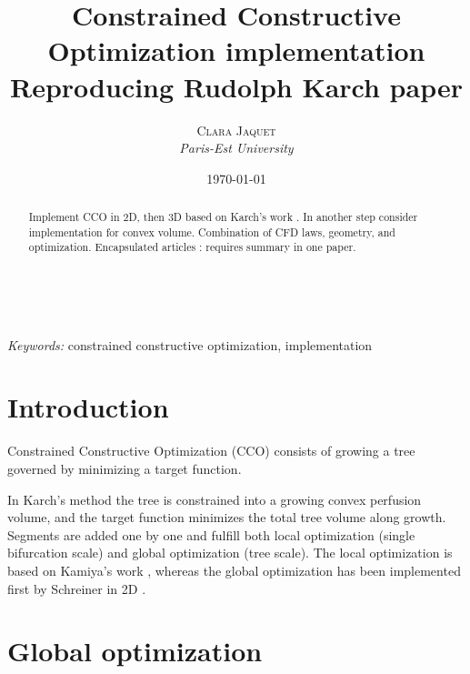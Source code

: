 \documentclass[a4paper, 11pt]{article} %
\title{\textbf{Constrained Constructive Optimization implementation}\\ %
Reproducing Rudolph Karch paper} %
\author{\textsc{Clara Jaquet} %
\\{\textit{Paris-Est University}}} %
\date{\today} %
\makeatletter
\renewcommand{\maketitle}{ %
\begin{flushright} %
{\LARGE\@title} %

\vspace{50pt} %

{\large\@author} %
\\\@date %

\vspace{40pt} %
\end{flushright}
}
\makeatother
\begin{document}
\maketitle %



\begin{abstract}
Implement CCO in 2D, then 3D based on Karch's work \cite{karch1999three}. In another step consider implementation for convex volume. 
Combination of CFD laws, geometry, and optimization. Encapsulated articles : requires summary in one paper.
\end{abstract}

\hspace*{3,6mm}\textit{Keywords:} constrained constructive optimization, implementation %

\vspace{30pt} %

\tableofcontents

\section*{Introduction}

Constrained Constructive Optimization (CCO) consists of growing a tree governed by minimizing a target function. 

In Karch's method the tree is constrained into a growing convex perfusion volume, and the target function minimizes the total tree volume along growth. Segments are added one by one and fulfill both local optimization (single bifurcation scale) and global optimization (tree scale). The local optimization is based on Kamiya's work \cite{kamiya1972optimal}, whereas the global optimization has been implemented first by Schreiner in 2D \cite{schreiner1993computer}. 

\section{Global optimization}
\end{document}
